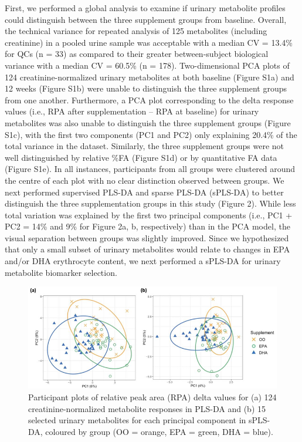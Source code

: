 \documentclass[journal=jacsat,manuscript=article]{achemso}
\begin{document}
First, we performed a global analysis to examine if urinary metabolite
profiles could distinguish between the three supplement groups from
baseline. Overall, the technical variance for repeated analysis of 125
metabolites (including creatinine) in a pooled urine sample was
acceptable with a median CV = 13.4\% for QCs (n = 33) as compared to
their greater between-subject biological variance with a median CV =
60.5\% (n = 178). Two-dimensional PCA plots of 124 creatinine-normalized
urinary metabolites at both baseline (Figure S1a) and 12 weeks (Figure
S1b) were unable to distinguish the three supplement groups from one
another. Furthermore, a PCA plot corresponding to the delta response
values (i.e., RPA after supplementation -- RPA at baseline) for urinary
metabolites was also unable to distinguish the three supplement groups
(Figure S1c), with the first two components (PC1 and PC2) only
explaining 20.4\% of the total variance in the dataset. Similarly, the
three supplement groups were not well distinguished by relative \%FA
(Figure S1d) or by quantitative FA data (Figure S1e). In all instances,
participants from all groups were clustered around the centre of each
plot with no clear distinction observed between groups. We next
performed supervised PLS-DA and sparse PLS-DA (sPLS-DA) to better
distinguish the three supplementation groups in this study (Figure 2).
While less total variation was explained by the first two principal
components (i.e., PC1 + PC2 = 14\% and 9\% for Figure 2a, b,
respectively) than in the PCA model, the visual separation between
groups was slightly improved. Since we hypothesized that only a small
subset of urinary metabolites would relate to changes in EPA and/or DHA
erythrocyte content, we next performed a sPLS-DA for urinary metabolite
biomarker selection.

\begin{figure}
\includegraphics[width=0.8\linewidth]{../Figures/PC1_O3I} \caption{Participant plots of relative peak area (RPA) delta values for (a) 124 creatinine-normalized metabolite responses in PLS-DA and (b) 15 selected urinary metabolites for each principal component in sPLS-DA, coloured by group (OO = orange, EPA = green, DHA = blue).}\label{fig:unnamed-chunk-2}
\end{figure}
\end{document}
